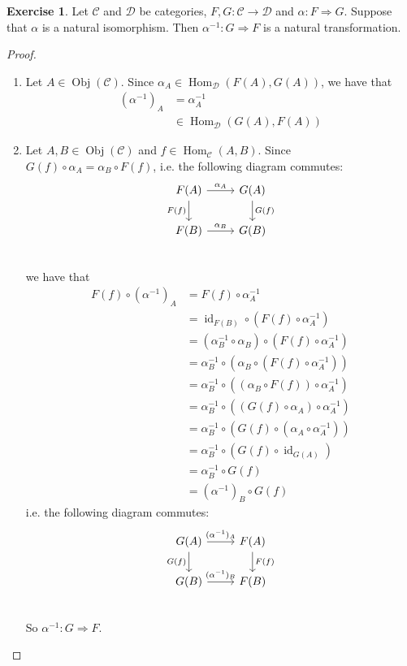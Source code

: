 \documentclass{book}
\theoremstyle{definition}
\newtheorem{ex}[definition]{Exercise}
\newcommand{\al}{\alpha}
\newcommand{\MC}{\mathcal{C}}
\newcommand{\MD}{\mathcal{D}}
\newcommand{\lex}[1]{\label{ex:#1}}
\DeclareMathOperator{\id}{id}
\DeclareMathOperator{\Obj}{Obj}
\DeclareMathOperator{\Hom}{Hom}
\DeclareMathOperator*{\0}{\mbf{0}}
\DeclareMathOperator*{\1}{\mbf{1}}
\begin{document}
	\begin{ex} \lex{15011.3}
		Let $\MC$ and $\MD$ be categories, $F,G: \MC \rightarrow \MD$ and $\al : F \Rightarrow G$. Suppose that $\al$ is a natural isomorphism. Then $\al^{-1}: G \Rightarrow F$ is a natural transformation. 
	\end{ex}
	
	\begin{proof}\
		\begin{enumerate}
			\item Let $A \in \Obj(\MC)$. Since $\al_A \in \Hom_{\MD}(F(A), G(A))$, we have that 
			\begin{align*}
				(\al^{-1})_A
				& = \al_A^{-1} \\
				& \in \Hom_{\MD}(G(A), F(A))
			\end{align*}
			\item Let $A, B \in \Obj(\MC)$ and $f \in \Hom_{\MC}(A,B)$. Since $G(f) \circ \al_A = \al_B \circ F(f)$, i.e. the following diagram commutes:
			\[ 
			\begin{tikzcd}
				F(A)  \arrow[r, "\al_A"]  \arrow[d, "F(f)"']  & G(A)   \arrow[d, "G(f)"]\\
				F(B) \arrow[r, "\al_B"] &  G(B) \\
			\end{tikzcd}
			\]
			we have that 
			\begin{align*}
				F(f) \circ (\al^{-1})_A 
				& = F(f) \circ \al_A^{-1} \\
				& = \id_{F(B)} \circ (F(f) \circ \al_A^{-1}) \\
				& = (\al_B^{-1} \circ \al_B) \circ (F(f) \circ \al_A^{-1}) \\
				& = \al_B^{-1} \circ (\al_B \circ (F(f) \circ \al_A^{-1})) \\
				& = \al_B^{-1} \circ ((\al_B \circ F(f)) \circ \al_A^{-1}) \\
				& = \al_B^{-1} \circ ((G(f) \circ \al_A) \circ \al_A^{-1}) \\
				& = \al_B^{-1} \circ (G(f) \circ (\al_A \circ \al_A^{-1})) \\
				& = \al_B^{-1} \circ (G(f) \circ \id_{G(A)}) \\
				& = \al_B^{-1} \circ G(f) \\
				& = (\al^{-1})_B \circ G(f) 
 			\end{align*}
 			i.e. the following diagram commutes:
 			\[ 
 			\begin{tikzcd}
 				G(A)  \arrow[r, "(\al^{-1})_A"]  \arrow[d, "G(f)"']  & F(A)   \arrow[d, "F(f)"]\\
 				G(B) \arrow[r, "(\al^{-1})_B"] &  F(B) \\
 			\end{tikzcd}
 			\]
 			So $\al^{-1}: G \Rightarrow F$.
		\end{enumerate}
	\end{proof}
\end{document}
